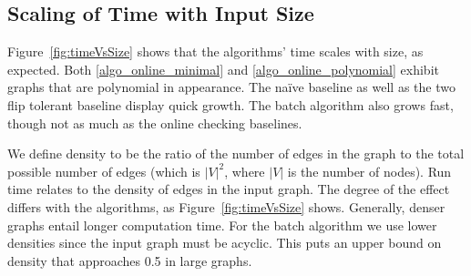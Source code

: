 \documentclass[sigplan]{acmart}
\begin{document}
\subsection{Scaling of Time with Input Size}

Figure~\ref{fig:timeVsSize} shows that the algorithms' time scales with size, as expected.
Both \ref{algo_online_minimal} and \ref{algo_online_polynomial} exhibit graphs that are polynomial in appearance.
The na\"{i}ve baseline as well as the two flip tolerant baseline display quick growth.
The batch algorithm also grows fast, though not as much as the online checking baselines.

We define density to be the ratio of the number of edges in the graph to the total possible number of edges (which is $|V|^2$, where $|V|$ is the number of nodes).
Run time relates to the density of edges in the input graph.
The degree of the effect differs with the algorithms, as Figure~\ref{fig:timeVsSize} shows.
Generally, denser graphs entail longer computation time.
For the batch algorithm we use lower densities since the input graph must be acyclic. This puts an upper bound on density that approaches 0.5 in large graphs.
\end{document}

